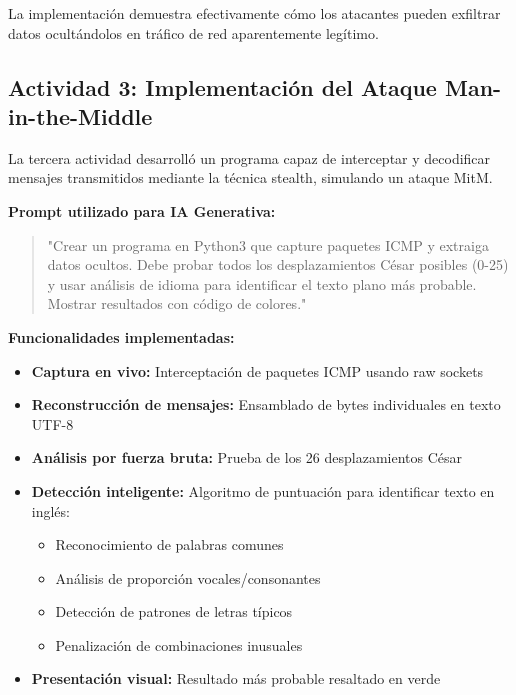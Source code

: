 \documentclass[letter,12pt]{article}
\begin{document}
La implementación demuestra efectivamente cómo los atacantes pueden exfiltrar datos ocultándolos en tráfico de red aparentemente legítimo.

\subsection{Actividad 3: Implementación del Ataque Man-in-the-Middle}

La tercera actividad desarrolló un programa capaz de interceptar y decodificar mensajes transmitidos mediante la técnica stealth, simulando un ataque MitM.

\textbf{Prompt utilizado para IA Generativa:}
\begin{quote}
"Crear un programa en Python3 que capture paquetes ICMP y extraiga datos ocultos. Debe probar todos los desplazamientos César posibles (0-25) y usar análisis de idioma para identificar el texto plano más probable. Mostrar resultados con código de colores."
\end{quote}

\textbf{Funcionalidades implementadas:}
\begin{itemize}
    \item \textbf{Captura en vivo:} Interceptación de paquetes ICMP usando raw sockets
    
    \item \textbf{Reconstrucción de mensajes:} Ensamblado de bytes individuales en texto UTF-8
    
    \item \textbf{Análisis por fuerza bruta:} Prueba de los 26 desplazamientos César
    
    \item \textbf{Detección inteligente:} Algoritmo de puntuación para identificar texto en inglés:
    \begin{itemize}
        \item Reconocimiento de palabras comunes
        
        \item Análisis de proporción vocales/consonantes
        
        \item Detección de patrones de letras típicos
        
        \item Penalización de combinaciones inusuales
    \end{itemize}
    
    \item \textbf{Presentación visual:} Resultado más probable resaltado en verde
\end{itemize}
\end{document}
